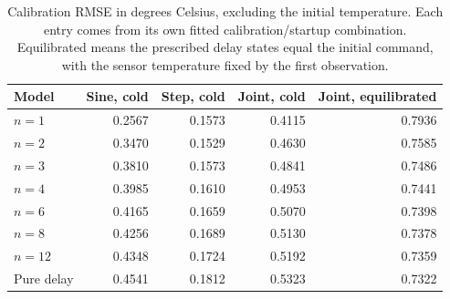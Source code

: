 \begin{table}[tbp]
\centering
\small
\begin{tabular}{lrrrr}
\toprule
Model & Sine, cold & Step, cold & Joint, cold & Joint, equilibrated \\
\midrule
$n=1$ & 0.2567 & 0.1573 & 0.4115 & 0.7936 \\
$n=2$ & 0.3470 & 0.1529 & 0.4630 & 0.7585 \\
$n=3$ & 0.3810 & 0.1573 & 0.4841 & 0.7486 \\
$n=4$ & 0.3985 & 0.1610 & 0.4953 & 0.7441 \\
$n=6$ & 0.4165 & 0.1659 & 0.5070 & 0.7398 \\
$n=8$ & 0.4256 & 0.1689 & 0.5130 & 0.7378 \\
$n=12$ & 0.4348 & 0.1724 & 0.5192 & 0.7359 \\
Pure delay & 0.4541 & 0.1812 & 0.5323 & 0.7322 \\
\bottomrule
\end{tabular}
\caption{Calibration RMSE in degrees Celsius, excluding the initial temperature. Each entry comes from its own fitted calibration/startup combination. Equilibrated means the prescribed delay states equal the initial command, with the sensor temperature fixed by the first observation.}
\label{tab:calibration-rmse}
\end{table}
